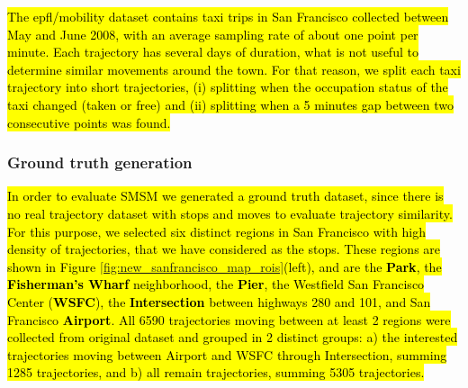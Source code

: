 \documentclass[12pt]{article}
\begin{document}
\hl{The epfl/mobility dataset contains taxi trips in San Francisco collected between May and June 2008, with an average sampling rate of about one point per minute. Each trajectory has several days of duration, what is not useful to determine similar movements around the town. For that reason, we split each taxi trajectory into short trajectories, (i) splitting when the occupation status of the taxi changed (taken or free) and (ii) splitting when a 5 minutes gap between two consecutive points was found.}

\subsubsection{Ground truth generation}
\hl{In order to evaluate SMSM we generated a ground truth dataset, since there is no real trajectory dataset with stops and moves to evaluate trajectory similarity. For this purpose, we selected six distinct regions in San Francisco with high density of trajectories, that we have considered as the stops. These regions are shown in Figure {\ref{fig:new_sanfrancisco_map_rois}}(left), and are the \textbf{Park}, the \textbf{Fisherman's Wharf} neighborhood, the \textbf{Pier}, the Westfield San Francisco Center (\textbf{WSFC}), the \textbf{Intersection} between highways 280 and 101, and San Francisco \textbf{Airport}. All 6590 trajectories moving between at least 2 regions were collected from original dataset and grouped in 2 distinct groups: a) the interested trajectories moving between Airport and WSFC through Intersection, summing 1285 trajectories, and b) all remain trajectories, summing 5305 trajectories.}
\end{document}
